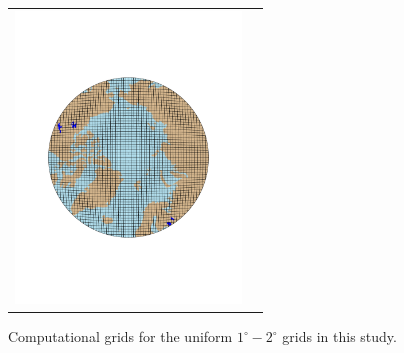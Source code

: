 \documentclass[draft]{agujournal2019}
\begin{document}
\begin{figure}[t]
\begin{center}
\begin{tabular}{cc}
         \includegraphics[width=60mm]{figs/grid-ne30pg3.pdf} \\
\end{tabular}
\end{center}
\caption{Computational grids for the uniform $1^{\circ}-2^{\circ}$ grids in this study.}
\label{fig:uni-grids}
\end{figure}
\end{document}
